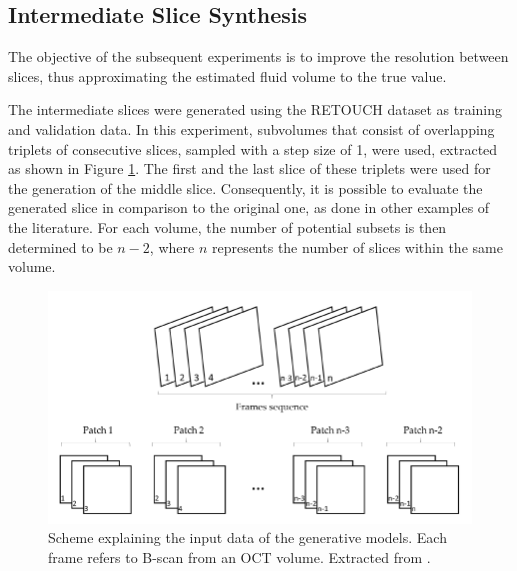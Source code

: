 \subsection{Intermediate Slice Synthesis}
The objective of the subsequent experiments is to improve the resolution between slices, thus approximating the estimated fluid volume to the true value.
\par
The intermediate slices were generated using the RETOUCH dataset as training and validation data. In this experiment, subvolumes that consist of overlapping triplets of consecutive slices, sampled with a step size of 1, were used, extracted as shown in Figure \ref{fig:FrameInterpolationFramework}. The first and the last slice of these triplets were used for the generation of the middle slice. Consequently, it is possible to evaluate the generated slice in comparison to the original one, as done in other examples of the literature. For each volume, the number of potential subsets is then determined to be $n-2$, where $n$ represents the number of slices within the same volume.

\begin{figure}[!ht]
	\centering
	\includegraphics[width=1.0\linewidth]{figures/FrameInterpolationFramework.png}
	\caption{Scheme explaining the input data of the generative models. Each frame refers to B-scan from an OCT volume. Extracted from \textcite{Tran2020}.}
	\label{fig:FrameInterpolationFramework}
\end{figure}

